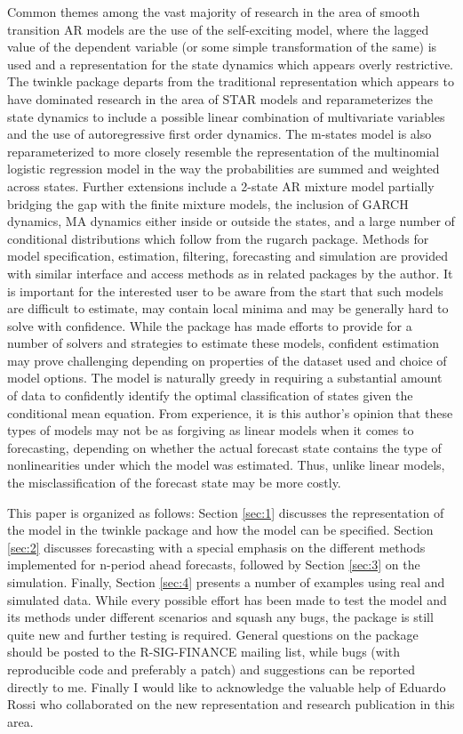 Common themes among the vast majority of research in the area of smooth
transition AR models are the use of the self-exciting model, where the lagged
value of the dependent variable (or some simple transformation of the same) is
used and a representation for the state dynamics which appears overly
restrictive.
The twinkle package departs from the traditional representation which appears to
have dominated research in the area of STAR models and reparameterizes the state
dynamics to include a possible linear combination of multivariate
variables and the use of autoregressive first order dynamics. The m-states model
is also reparameterized to more closely resemble the representation of the
multinomial logistic regression model in the way the probabilities are summed
and weighted across states. Further extensions include a 2-state AR mixture
model partially bridging the gap with the finite mixture models, the inclusion of 
GARCH dynamics, MA dynamics either inside or outside the states, and a large
number of conditional distributions which follow from the rugarch package. Methods 
for model specification, estimation, filtering, forecasting and simulation are
provided with similar interface and access methods as in related packages by the author. 
It is important for the interested user to be aware from the start that such
models are difficult to estimate, may contain local minima and may be generally
hard to solve with confidence. While the package has made efforts to provide for a 
number of solvers and strategies to estimate these models, confident estimation
may prove challenging depending on properties of the dataset used and choice of 
model options. The model is naturally greedy in requiring a substantial amount of data to
confidently identify the optimal classification of states given the conditional
mean equation. From experience, it is this author's opinion that these types of
models may not be as forgiving as linear models when it comes to forecasting, 
depending on whether the actual forecast state contains the type of
nonlinearities under which the model was estimated. Thus, unlike linear
models, the misclassification of the forecast state may be more costly.

This paper is organized as follows: Section \ref{sec:1} discusses the
representation of the model in the twinkle package and how the model can be
specified. Section \ref{sec:2} discusses forecasting with a special emphasis on
the different methods implemented for n-period ahead forecasts, followed by
Section \ref{sec:3} on the simulation. Finally, Section \ref{sec:4} presents a
number of examples using real and simulated data.
While every possible effort has been made to test the model and its methods
under different scenarios and squash any bugs, the package is still quite new
and further testing is required. General questions on the package should be
posted to the R-SIG-FINANCE mailing list, while bugs (with reproducible code
and preferably a patch) and suggestions can be reported directly to me.
Finally I would like to acknowledge the valuable help of Eduardo Rossi who
collaborated on the new representation and research publication in this area.
